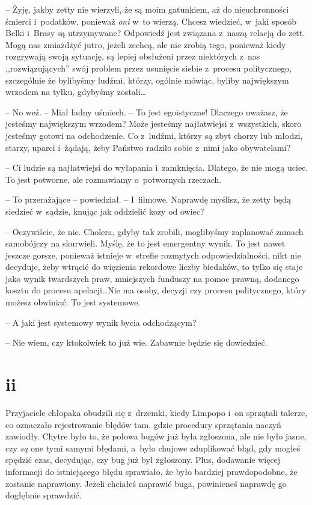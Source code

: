 \documentclass[oneside,polish,11pt,sfheadings]{mwbk}
\begin{document}
-- Żyję, jakby zetty nie wierzyli, że są moim gatunkiem, aż do
nieuchronności śmierci i~podatków, ponieważ \textit{oni} w~to wierzą.
Chcesz wiedzieć, w~jaki sposób Belki i~Brasy są utrzymywane? Odpowiedź
jest związana z~naszą relacją do zett. Mogą nas zmiażdżyć jutro, jeżeli
zechcą, ale nie zrobią tego, ponieważ kiedy rozgrywają swoją sytuację,
są lepiej obsłużeni przez niektórych z~nas ,,rozwiązujących'' swój
problem przez usunięcie siebie z~procesu politycznego, szczególnie że
bylibyśmy ludźmi, którzy, ogólnie mówiąc, byliby największym wrzodem na
tyłku, gdybyśmy zostali\ldots 

-- No weź. -- Miał ładny uśmiech. -- To jest egoistyczne! Dlaczego uważasz,
że jesteśmy największym wrzodem? Może jesteśmy najłatwiejsi z~wszystkich, skoro jesteśmy gotowi na odchodzenie. Co z~ludźmi, którzy są
zbyt chorzy lub młodzi, starzy, uparci i~żądają, żeby Państwo radziło
sobie z~nimi jako obywatelami?

-- Ci ludzie są najłatwiejsi do wyłapania i~zamknięcia. Dlatego, że nie
mogą uciec. To jest potworne, ale rozmawiamy o~potwornych rzeczach.

-- To przerażające -- powiedział. -- I~filmowe. Naprawdę myślisz, że zetty
będą siedzieć w~sądzie, knując jak oddzielić kozy od owiec?

-- Oczywiście, że nie. Cholera, gdyby tak zrobili, moglibyśmy zaplanować
zamach samobójczy na skurwieli. Myślę, że to jest emergentny wynik. To
jest nawet jeszcze gorsze, ponieważ istnieje w~strefie rozmytych
odpowiedzialności, nikt nie decyduje, żeby wtrącić do więzienia
rekordowe liczby biedaków, to tylko się staje jako wynik twardszych
praw, mniejszych funduszy na pomoc prawną, dodanego kosztu do procesu
apelacji\ldots  Nie ma osoby, decyzji czy procesu politycznego, który możesz
obwiniać. To jest systemowe.

-- A jaki jest systemowy wynik bycia odchodzącym?

-- Nie wiem, czy ktokolwiek to już wie. Zabawnie będzie się dowiedzieć.

\chapter*{ii}
Przyjaciele chłopaka obudzili się z~drzemki, kiedy Limpopo i~on
sprzątali talerze, co oznaczało rejestrowanie błędów tam, gdzie
procedury sprzątania naczyń zawiodły. Chytre było to, że połowa bugów
już była zgłoszona, ale nie było jasne, czy \textit{są }one tymi samymi
błędami, a~było chujowe zduplikować błąd, gdy mogłeś spędzić czas,
decydując, czy bug już był zgłoszony. Plus, dodawanie więcej informacji
do istniejącego błędu sprawiało, że było bardziej prawdopodobne, że
zostanie naprawiony. Jeżeli chciałeś naprawić buga, powinieneś naprawdę
go dogłębnie sprawdzić.
\end{document}
